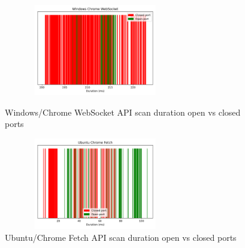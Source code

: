 \begin{figure}[ht]
\centering
\begin{minipage}{.45\textwidth}
  \centering
\includegraphics[width=8cm, height=4cm, keepaspectratio]{port_scanning_techniques/img/windows_chrome_efficacy_websocket.png}
    \caption{Windows/Chrome WebSocket API scan duration open vs closed ports}
    \label{fig:appendix-win-chrome-websocket}
\end{minipage}
\hspace{0.5cm} %
\begin{minipage}{.45\textwidth}
\includegraphics[width=8cm, height=4cm, keepaspectratio]{port_scanning_techniques/img/ubuntu_chrome_efficacy_fetch.png}
    \caption{Ubuntu/Chrome Fetch API scan duration open vs closed ports}
    \label{fig:ubuntu-chrome-fetch}
\end{minipage}
\end{figure}

